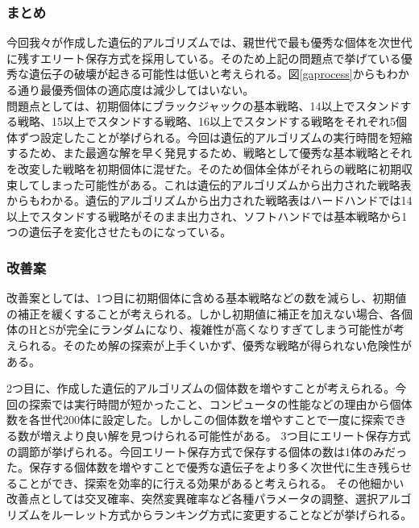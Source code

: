\subsubsection{まとめ}
今回我々が作成した遺伝的アルゴリズムでは、親世代で最も優秀な個体を次世代に残すエリート保存方式を採用している。そのため上記の問題点で挙げている優秀な遺伝子の破壊が起きる可能性は低いと考えられる。図\ref{gaprocess}からもわかる通り最優秀個体の適応度は減少してはいない。\\
問題点としては、初期個体にブラックジャックの基本戦略、14以上でスタンドする戦略、15以上でスタンドする戦略、16以上でスタンドする戦略をそれぞれ5個体ずつ設定したことが挙げられる。今回は遺伝的アルゴリズムの実行時間を短縮するため、また最適な解を早く発見するため、戦略として優秀な基本戦略とそれを改変した戦略を初期個体に混ぜた。そのため個体全体がそれらの戦略に初期収束してしまった可能性がある。これは遺伝的アルゴリズムから出力された戦略表からもわかる。遺伝的アルゴリズムから出力された戦略表はハードハンドでは14以上でスタンドする戦略がそのまま出力され、ソフトハンドでは基本戦略から1つの遺伝子を変化させたものになっている。

\subsubsection{改善案}
改善案としては、1つ目に初期個体に含める基本戦略などの数を減らし、初期値の補正を緩くすることが考えられる。しかし初期値に補正を加えない場合、各個体のHとSが完全にランダムになり、複雑性が高くなりすぎてしまう可能性が考えられる。そのため解の探索が上手くいかず、優秀な戦略が得られない危険性がある。

2つ目に、作成した遺伝的アルゴリズムの個体数を増やすことが考えられる。今回の探索では実行時間が短かったこと、コンピュータの性能などの理由から個体数を各世代200体に設定した。しかしこの個体数を増やすことで一度に探索できる数が増えより良い解を見つけられる可能性がある。
3つ目にエリート保存方式の調節が挙げられる。今回エリート保存方式で保存する個体の数は1体のみだった。保存する個体数を増やすことで優秀な遺伝子をより多く次世代に生き残らせることができ、探索を効率的に行える効果があると考えられる。
その他細かい改善点としては交叉確率、突然変異確率など各種パラメータの調整、選択アルゴリズムをルーレット方式からランキング方式に変更することなどが挙げられる。
